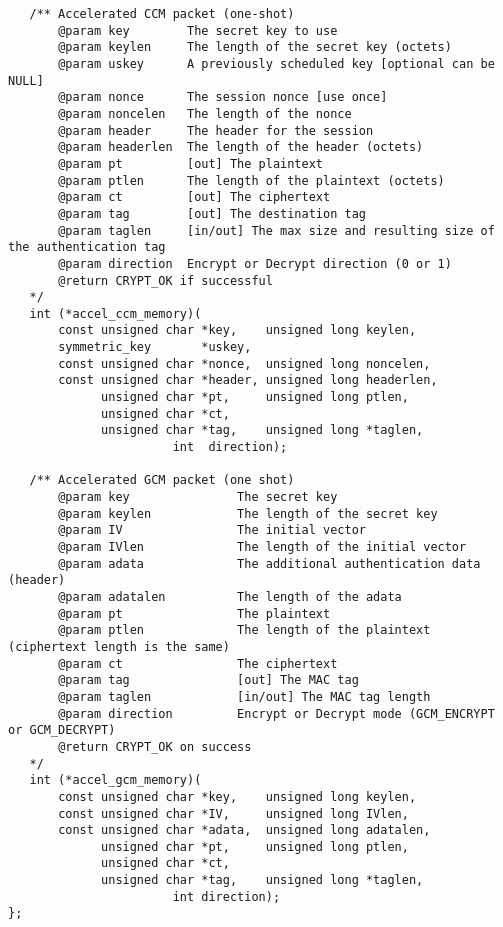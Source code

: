 \documentclass[a4paper]{book}
\begin{document}
\begin{small}
\begin{verbatim}
   /** Accelerated CCM packet (one-shot)
       @param key        The secret key to use
       @param keylen     The length of the secret key (octets)
       @param uskey      A previously scheduled key [optional can be NULL]
       @param nonce      The session nonce [use once]
       @param noncelen   The length of the nonce
       @param header     The header for the session
       @param headerlen  The length of the header (octets)
       @param pt         [out] The plaintext
       @param ptlen      The length of the plaintext (octets)
       @param ct         [out] The ciphertext
       @param tag        [out] The destination tag
       @param taglen     [in/out] The max size and resulting size of the authentication tag
       @param direction  Encrypt or Decrypt direction (0 or 1)
       @return CRYPT_OK if successful
   */
   int (*accel_ccm_memory)(
       const unsigned char *key,    unsigned long keylen,
       symmetric_key       *uskey,
       const unsigned char *nonce,  unsigned long noncelen,
       const unsigned char *header, unsigned long headerlen,
             unsigned char *pt,     unsigned long ptlen,
             unsigned char *ct,
             unsigned char *tag,    unsigned long *taglen,
                       int  direction);

   /** Accelerated GCM packet (one shot)
       @param key               The secret key
       @param keylen            The length of the secret key
       @param IV                The initial vector 
       @param IVlen             The length of the initial vector
       @param adata             The additional authentication data (header)
       @param adatalen          The length of the adata
       @param pt                The plaintext
       @param ptlen             The length of the plaintext (ciphertext length is the same)
       @param ct                The ciphertext
       @param tag               [out] The MAC tag
       @param taglen            [in/out] The MAC tag length
       @param direction         Encrypt or Decrypt mode (GCM_ENCRYPT or GCM_DECRYPT)
       @return CRYPT_OK on success
   */
   int (*accel_gcm_memory)(
       const unsigned char *key,    unsigned long keylen,
       const unsigned char *IV,     unsigned long IVlen,
       const unsigned char *adata,  unsigned long adatalen,
             unsigned char *pt,     unsigned long ptlen,
             unsigned char *ct, 
             unsigned char *tag,    unsigned long *taglen,
                       int direction);
};
\end{verbatim}
\end{small}
\end{document}
